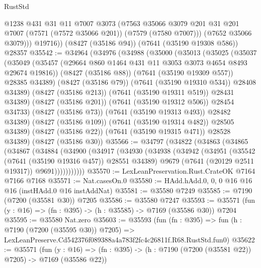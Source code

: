 \begin{lexlean}{RustStd}
\begin{coremodule}
            @1238
            @431
            @31
            @11
            @7007
            @3073
            (@7563
              @35066
              @3079
              @201
              @31
              @201
              @7007
              (@7571 (@7572 @35066 @201))
              (@7579 (@7580 @7007)))
            (@7652 @35066 @3079)))
        @19716))
    (@8427 (@35186 @94))
    (@7641 (@35190 @19308 @586))
    @28357
@35542 := @34964
    (@34976
      (@34988
        (@35000
          (@35013
            (@35025
              (@35037
                (@35049
                  (@35457 (@29664 @860 @1464 @431 @11 @3053 @3073 @4654 @8493 @29674 @19816))
                  (@8427 (@35186 @88))
                  (@7641 (@35190 @19309 @557))
                  @28385
                  @34389)
                (@8427 (@35186 @79))
                (@7641 (@35190 @19310 @534))
                @28408
                @34389)
              (@8427 (@35186 @213))
              (@7641 (@35190 @19311 @519))
              @28431
              @34389)
            (@8427 (@35186 @201))
            (@7641 (@35190 @19312 @506))
            @28454
            @34733)
          (@8427 (@35186 @73))
          (@7641 (@35190 @19313 @493))
          @28482
          @34389)
        (@8427 (@35186 @109))
        (@7641 (@35190 @19314 @482))
        @28505
        @34389)
      (@8427 (@35186 @22))
      (@7641 (@35190 @19315 @471))
      @28528
      @34389)
    (@8427 (@35186 @30))
@35566 := @34797
    (@34822
      (@34863
        (@34865
          (@34867
            (@34884
              (@34900
                (@34917
                  (@34930
                    (@34938
                      (@34942
                        (@34951
                          (@35542 (@7641 (@35190 @19316 @457)) @28551 @34389)
                          @9679
                          (@7641 (@20129 @2511 @19317))
                          @9691)))))))))))
@35570 := LexLeanPreservation.Rust.CrateOK @7164 @7166 @7168
@35571 := Nat.casesOn.{0}
@35580 := HAdd.hAdd.{0, 0, 0} @16 @16 @16 (instHAdd.{0} @16 instAddNat)
@35581 := @35580 @7249
@35585 := @7190 (@7200 (@35581 @30)) @7205
@35586 := @35580 @7247
@35593 := @35571 (fun (y : @16) => (fn : @395) -> (h : @35585) -> @7169 (@35586 @30)) @7204
@35595 := @35580 Nat.zero
@35603 := @35593
    (fun (fn : @395) =>
    fun (h : @7190 (@7200 (@35595 @30)) @7205) =>
    LexLeanPreserve.Cd542376f089388a4a783f2fc4c26811f.R68.RustStd.fun0)
@35622 := @35571
    (fun (y : @16) => (fn : @395) -> (h : @7190 (@7200 (@35581 @22)) @7205) -> @7169 (@35586 @22))

\end{coremodule}
\end{lexlean}
